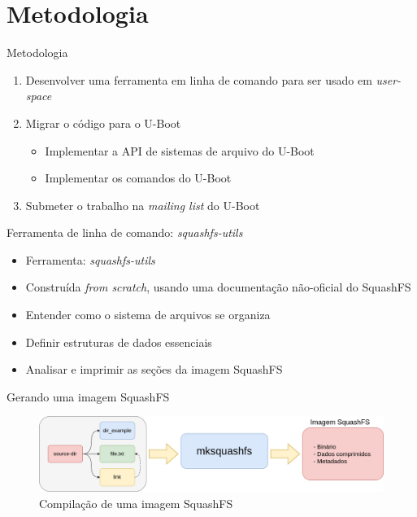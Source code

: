 \section{Metodologia}
\begin{frame}{Metodologia}
	\begin{enumerate}
	    \item Desenvolver uma ferramenta em linha de comando para ser usado em \textit{user-space}
	    \item Migrar o código para o U-Boot
	    \begin{itemize}
	        \item Implementar a API de sistemas de arquivo do U-Boot
	        \item Implementar os comandos do U-Boot
	    \end{itemize}
	    \item Submeter o trabalho na \textit{mailing list} do U-Boot
	\end{enumerate}
\end{frame} 

\begin{frame}{Ferramenta de linha de comando: \textit{squashfs-utils}}
	\begin{itemize}
	    \item Ferramenta: \textit{squashfs-utils}
	    \item Construída \textit{from scratch}, usando uma documentação não-oficial do SquashFS
	    \item Entender como o sistema de arquivos se organiza
	    \item Definir estruturas de dados essenciais
	    \item Analisar e imprimir as seções da imagem SquashFS
	\end{itemize}
\end{frame}

\begin{frame}{Gerando uma imagem SquashFS}
    \begin{figure}
        \centering
        \includegraphics[scale=0.25]{figuras/mksquashfs.png}
        \caption{Compilação de uma imagem SquashFS}
        \label{fig:my_label}
    \end{figure}
\end{frame}


